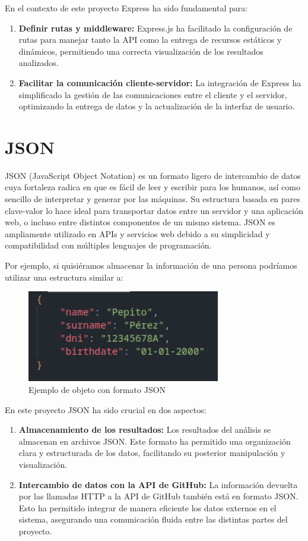 \documentclass[a4paper, 12pt]{book}
\begin{document}
En el contexto de este proyecto Express ha sido fundamental para:

\begin{enumerate}
    \item \textbf{Definir rutas y middleware:} Express.js ha facilitado la configuración de rutas para manejar tanto la API como la entrega de recursos estáticos y dinámicos, permitiendo una correcta visualización de los resultados analizados.
    \item \textbf{Facilitar la comunicación cliente-servidor:} La integración de Express ha simplificado la gestión de las comunicaciones entre el cliente y el servidor, optimizando la entrega de datos y la actualización de la interfaz de usuario.
\end{enumerate}

\section{JSON}
JSON (JavaScript Object Notation) es un formato ligero de intercambio de datos cuya fortaleza radica en que es fácil de leer y escribir para los humanos, así como sencillo de interpretar y generar por las máquinas. Su estructura basada en pares clave-valor lo hace ideal para transportar datos entre un servidor y una aplicación web, o incluso entre distintos componentes de un mismo sistema. JSON es ampliamente utilizado en APIs y servicios web debido a su simplicidad y compatibilidad con múltiples lenguajes de programación.

Por ejemplo, si quisiéramos almacenar la información de una persona podríamos utilizar una estructura similar a:

\begin{figure} [h]
    \centering
    \includegraphics[height=4cm, keepaspectratio]{img/example_json.png}
    \caption{Ejemplo de objeto con formato JSON}
    \label{fig:enter-label}
\end{figure}

En este proyecto JSON ha sido crucial en dos aspectos:

\begin{enumerate}
    \item \textbf{Almacenamiento de los resultados:} Los resultados del análisis se almacenan en archivos JSON. Este formato ha permitido una organización clara y estructurada de los datos, facilitando su posterior manipulación y visualización.
    \item \textbf{Intercambio de datos con la API de GitHub:} La información devuelta por las llamadas HTTP a la API de GitHub también está en formato JSON. Esto ha permitido integrar de manera eficiente los datos externos en el sistema, asegurando una comunicación fluida entre las distintas partes del proyecto.
\end{enumerate}
\end{document}
